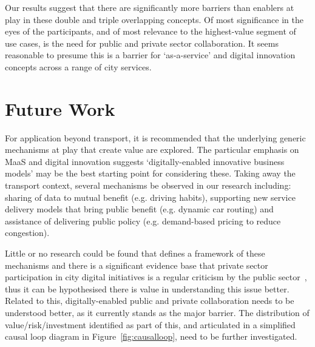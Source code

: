 \documentclass[journal]{IEEEtran}
\begin{document}
Our results suggest that there are significantly more barriers than
enablers at play in these double and triple overlapping concepts. Of
most significance in the eyes of the participants, and of most
relevance to the highest-value segment of use cases, is the need for
public and private sector collaboration. It seems reasonable to
presume this is a barrier for `as-a-service' and digital innovation
concepts across a range of city services.



\section{Future Work}\label{future}

For application beyond transport, it is recommended that the
underlying generic mechanisms at play that create value are
explored. The particular emphasis on MaaS and digital innovation
suggests `digitally-enabled innovative business models' may be the
best starting point for considering these. Taking away the transport
context, several mechanisms be observed in our research including:
sharing of data to mutual benefit (e.g. driving habits), supporting
new service delivery models that bring public benefit (e.g. dynamic
car routing) and assistance of delivering public policy
(e.g. demand-based pricing to reduce congestion).

Little or no research could be found that defines a framework of these
mechanisms and there is a significant evidence base that private
sector participation in city digital initiatives is a regular
criticism by the public sector~\cite{martin:2016}, thus it can be
hypothesised there is value in understanding this issue
better. Related to this, digitally-enabled public and private
collaboration needs to be understood better, as it currently stands as
the major barrier. The distribution of value/risk/investment
identified as part of this, and articulated in a simplified causal
loop diagram in Figure~\ref{fig:causalloop}, need to be further
investigated.
\end{document}
